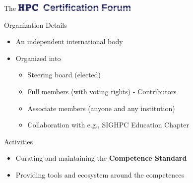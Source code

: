 \documentclass[compress,aspectratio=169]{beamer}
\begin{document}
\begin{frame}{The \includegraphics[width=0.45\textwidth]{hpccf-full}}

	\begin{block}{Organization Details}
		\begin{itemize}
			\item An independent international body
			\item Organized into
				\begin{itemize}
					\item Steering board (elected)
					\item Full members (with voting rights) - Contributors
					\item Associate members (anyone and any institution)
          \item Collaboration with e.g., SIGHPC Education Chapter
				\end{itemize}
		\end{itemize}
	\end{block}

	\begin{block}{Activities}
		\begin{itemize}
			\item Curating and maintaining the \textbf{Competence Standard}
			\item Providing tools and ecosystem around the competences
		\end{itemize}
	\end{block}
\end{frame}
\end{document}
